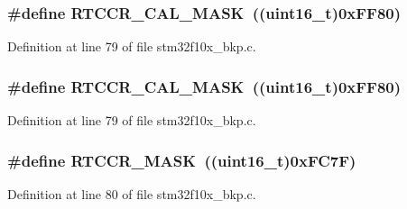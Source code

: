 \subsubsection[{\texorpdfstring{R\+T\+C\+C\+R\+\_\+\+C\+A\+L\+\_\+\+M\+A\+SK}{RTCCR_CAL_MASK}}]{\setlength{\rightskip}{0pt plus 5cm}\#define R\+T\+C\+C\+R\+\_\+\+C\+A\+L\+\_\+\+M\+A\+SK~(({\bf uint16\+\_\+t})0x\+F\+F80)}\hypertarget{group___b_k_p___private___defines_ga61a540c5dd9d18e936b8fd3e01f7f6ff}{}\label{group___b_k_p___private___defines_ga61a540c5dd9d18e936b8fd3e01f7f6ff}


Definition at line 79 of file stm32f10x\+\_\+bkp.\+c.

\subsubsection[{\texorpdfstring{R\+T\+C\+C\+R\+\_\+\+C\+A\+L\+\_\+\+M\+A\+SK}{RTCCR_CAL_MASK}}]{\setlength{\rightskip}{0pt plus 5cm}\#define R\+T\+C\+C\+R\+\_\+\+C\+A\+L\+\_\+\+M\+A\+SK~(({\bf uint16\+\_\+t})0x\+F\+F80)}\hypertarget{group___b_k_p___private___defines_ga61a540c5dd9d18e936b8fd3e01f7f6ff}{}\label{group___b_k_p___private___defines_ga61a540c5dd9d18e936b8fd3e01f7f6ff}


Definition at line 79 of file stm32f10x\+\_\+bkp.\+c.

\subsubsection[{\texorpdfstring{R\+T\+C\+C\+R\+\_\+\+M\+A\+SK}{RTCCR_MASK}}]{\setlength{\rightskip}{0pt plus 5cm}\#define R\+T\+C\+C\+R\+\_\+\+M\+A\+SK~(({\bf uint16\+\_\+t})0x\+F\+C7\+F)}\hypertarget{group___b_k_p___private___defines_ga4bda91755d5ae28e9e487e946917a1ec}{}\label{group___b_k_p___private___defines_ga4bda91755d5ae28e9e487e946917a1ec}


Definition at line 80 of file stm32f10x\+\_\+bkp.\+c.

